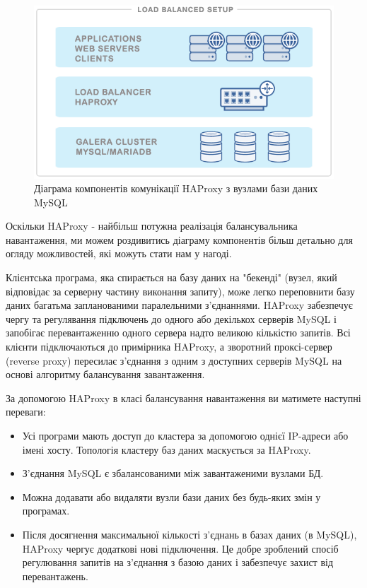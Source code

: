 \documentclass[14pt]{vakthesis}
\begin{document}
\begin{figure}
\centering
\includegraphics[width=\linewidth]{images/haproxy_database_balancing.png}
     \caption{Діаграма компонентів комунікації HAProxy з вузлами бази даних MySQL}
     \label{fig:haproxy_mysql}
\end{figure}


Оскільки HAProxy - найбільш потужна реалізація балансувальника навантаження, ми можем роздивитись діаграму компонентів більш детально для огляду можливостей, які можуть стати нам у нагоді.

Клієнтська програма, яка спирається на базу даних на "бекенді" (вузел, який відповідає за серверну частину виконання запиту), може легко переповнити базу даних багатьма запланованими паралельними з'єднаннями. HAProxy забезпечує чергу та регулявання підключень до одного або декількох серверів MySQL і запобігає перевантаженню одного сервера надто великою кількістю запитів. Всі клієнти підключаються до примірника HAProxy, а зворотний проксі-сервер (reverse proxy) пересилає з'єднання з одним з доступних серверів MySQL на основі алгоритму балансування завантаження.

За допомогою HAProxy в класі балансування навантаження ви матимете наступні переваги:

\begin{itemize}
\item Усі програми мають доступ до кластера за допомогою однієї IP-адреси або імені хосту. Топологія кластеру баз даних маскується за HAProxy.
\item З'єднання MySQL є збалансованими між завантаженими вузлами БД.
\item Можна додавати або видаляти вузли бази даних без будь-яких змін у програмах. 
\item Після досягнення максимальної кількості з'єднань в базах даних (в MySQL), HAProxy чергує додаткові нові підключення. Це добре зроблений спосіб регулювання запитів на з'єднання з базою даних і забезпечує захист від перевантажень.

\end{itemize}
\end{document}
